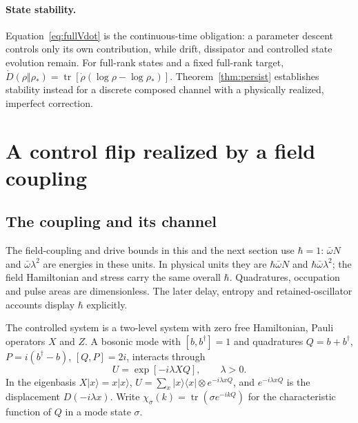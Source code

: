 \documentclass[aps,pre,onecolumn,superscriptaddress,floatfix,longbibliography]{revtex4-2}
\begin{document}
\paragraph{State stability.}\label{sec:toymodel}
Equation~\eqref{eq:fullVdot} is the continuous-time obligation: a parameter descent controls only its own contribution, while drift, dissipator and controlled state evolution remain. For full-rank states and a fixed full-rank target,
$\dot D(\rho\Vert\rho_*)=\operatorname{tr}[\dot\rho(\log\rho-\log\rho_*)]$.
Theorem~\ref{thm:persist} establishes stability instead for a discrete composed channel with a physically realized, imperfect correction.

\section{A control flip realized by a field coupling}
\label{sec:actuator}

\subsection{The coupling and its channel}

The field-coupling and drive bounds in this and the next section use
$\hbar=1$: $\bar\omega N$ and $\bar\omega\lambda^2$ are energies in
these units. In physical units they are $\hbar\bar\omega N$ and
$\hbar\bar\omega\lambda^2$; the field Hamiltonian and stress carry
the same overall $\hbar$. Quadratures, occupation and pulse areas are
dimensionless. The later delay, entropy and retained-oscillator accounts
display $\hbar$ explicitly.

The controlled system is a two-level system with zero free Hamiltonian, Pauli operators $X$ and $Z$. A bosonic mode with $[b,b^\dagger]=1$ and quadratures $Q=b+b^\dagger$, $P=i(b^\dagger-b)$, $[Q,P]=2i$, interacts through
\begin{equation}
U=\exp[-i\lambda XQ],\qquad \lambda>0.
\label{eq:U}
\end{equation}
In the eigenbasis $X|x\rangle=x|x\rangle$, $U=\sum_x|x\rangle\langle x|\otimes e^{-i\lambda xQ}$, and $e^{-i\lambda xQ}$ is the displacement $D(-i\lambda x)$. Write $\chi_\sigma(k)=\operatorname{tr}(\sigma e^{-ikQ})$ for the characteristic function of $Q$ in a mode state $\sigma$.
\end{document}
